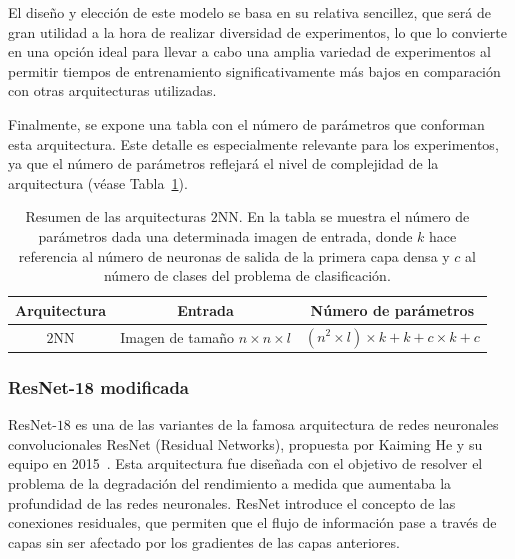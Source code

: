 El diseño y elección de este modelo se basa en su relativa sencillez, que será de gran utilidad a la hora de realizar diversidad de experimentos, lo que lo convierte en una opción ideal para llevar a cabo una amplia variedad de experimentos al permitir tiempos de entrenamiento significativamente más bajos en comparación con otras arquitecturas utilizadas.\newline

Finalmente, se expone una tabla con el número de parámetros que conforman esta arquitectura. Este detalle es especialmente relevante para los experimentos, ya que el número de parámetros reflejará el nivel de complejidad de la arquitectura (véase Tabla~\ref{tab:numero-parametros}).\newline

\begin{table}[ht]
    \centering
    \renewcommand{\arraystretch}{1.5} 
    \begin{tabular}{|c|c|c|}
    \hline
    \textbf{Arquitectura}          & \textbf{Entrada}                                   & \textbf{Número de parámetros}                     \\ \hline
    $2$NN                & Imagen de tamaño $n \times n \times l$                & $(n^2 \times l) \times k + k + c \times k + c$                                             \\ \hline
    \end{tabular}
    \caption[Resumen de las arquitecturas $2$NN.]{Resumen de las arquitecturas $2$NN. En la tabla se muestra el número de parámetros dada una determinada imagen de entrada, donde $k$ hace referencia al número de neuronas de salida de la primera capa densa y $c$ al número de clases del problema de clasificación.}\label{tab:numero-parametros}
\end{table}

\subsubsection{ResNet-18 modificada}\label{subsubsec:resnet18-modificada}

ResNet-$18$ es una de las variantes de la famosa arquitectura de redes neuronales convolucionales ResNet (Residual Networks), propuesta por Kaiming He y su equipo en 2015~\cite{He2015}. Esta arquitectura fue diseñada con el objetivo de resolver el problema de la degradación del rendimiento a medida que aumentaba la profundidad de las redes neuronales. ResNet introduce el concepto de las conexiones residuales, que permiten que el flujo de información pase a través de capas sin ser afectado por los gradientes de las capas anteriores.\newline

